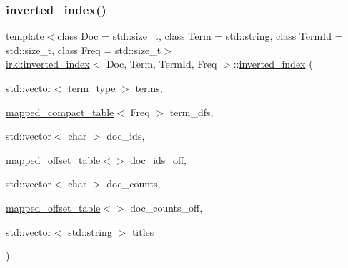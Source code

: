 \subsubsection{\texorpdfstring{inverted\+\_\+index()}{inverted\_index()}\hspace{0.1cm}{\footnotesize\ttfamily [1/2]}}
{\footnotesize\ttfamily template$<$class Doc  = std\+::size\+\_\+t, class Term  = std\+::string, class Term\+Id  = std\+::size\+\_\+t, class Freq  = std\+::size\+\_\+t$>$ \\
\mbox{\hyperlink{classirk_1_1inverted__index}{irk\+::inverted\+\_\+index}}$<$ Doc, Term, Term\+Id, Freq $>$\+::\mbox{\hyperlink{classirk_1_1inverted__index}{inverted\+\_\+index}} (\begin{DoxyParamCaption}\item[{std\+::vector$<$ \mbox{\hyperlink{classirk_1_1inverted__index_a7a60c2cec1774c08f21e8e27ccb5ac33}{term\+\_\+type}} $>$}]{terms,  }\item[{\mbox{\hyperlink{namespaceirk_a355b82a658f8685da29eca82444fed3c}{mapped\+\_\+compact\+\_\+table}}$<$ Freq $>$}]{term\+\_\+dfs,  }\item[{std\+::vector$<$ char $>$}]{doc\+\_\+ids,  }\item[{\mbox{\hyperlink{namespaceirk_ab3084e78181e92fe4bea7332e0a77e98}{mapped\+\_\+offset\+\_\+table}}$<$$>$}]{doc\+\_\+ids\+\_\+off,  }\item[{std\+::vector$<$ char $>$}]{doc\+\_\+counts,  }\item[{\mbox{\hyperlink{namespaceirk_ab3084e78181e92fe4bea7332e0a77e98}{mapped\+\_\+offset\+\_\+table}}$<$$>$}]{doc\+\_\+counts\+\_\+off,  }\item[{std\+::vector$<$ std\+::string $>$}]{titles }\end{DoxyParamCaption})\hspace{0.3cm}{\ttfamily [inline]}}

\mbox{\label{classirk_1_1inverted__index_a8b9969577ec0556c38ea05d5cc674fb8}} 
